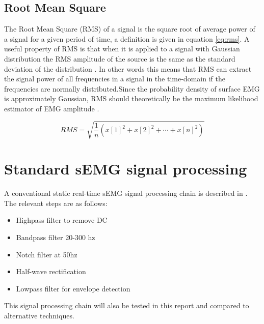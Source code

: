 \subsection{Root Mean Square}
The Root Mean Square (RMS) of a signal is the square root of average power of a signal for a given period of time, a definition is given in equation \ref{eq:rms}. A useful property of RMS is that when it is applied to a signal with Gaussian distribution the RMS amplitude of the source is the same as the standard deviation of the distribution \cite{rms_standard_deviation}. In other words this means that RMS can extract the signal power of all frequencies in a signal in the time-domain if the frequencies are normally distributed.Since the probability density of surface EMG is approximately Gaussian, RMS should theoretically be the maximum likelihood estimator of EMG amplitude \cite{semg_signals_analysis_and_applications}.

\begin{equation}
    RMS = \sqrt{\frac{1}{n} (x[1]^2 + x[2]^2 + \cdots + x[n]^2)}
    \label{eq:rms}
\end{equation}

\section{Standard sEMG signal processing}
A conventional static real-time sEMG signal processing chain is described in \cite{muscle_force_estimation}. The relevant steps are as follows:
\begin{itemize}
    \item Highpass filter to remove DC
    \item Bandpass filter 20-300 hz
    \item Notch filter at 50hz
    \item Half-wave rectification
    \item Lowpass filter for envelope detection
\end{itemize}

This signal processing chain will also be tested in this report and compared to alternative techniques.